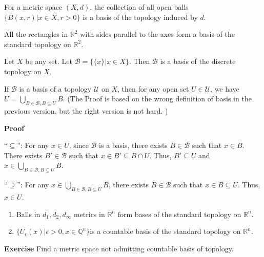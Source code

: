 \documentclass[main.tex]{subfiles}
\begin{document}
\begin{example}\label{basis1}
    For a metric space $(X, d)$, the collection of all open balls $\{B(x, r) | x \in X, r > 0\}$ is a basis of the topology induced by $d$.
\end{example}
\begin{example}\label{basis2}
    All the rectangles in $\mathbb{R}^2$ with sides parallel to the axes form a basis of the standard topology on $\mathbb{R}^2$.
\end{example}

\begin{example}
    Let $X$ be any set. Let $\mathcal{B} = \{\{x\} | x \in X\}$. Then $\mathcal{B}$ is a basis of the discrete topology on $X$.
\end{example}

\begin{theorem}
    If $\mathcal{B}$ is a basis of a topology $\mathcal{U}$ on $X$, then for any open set $U \in \mathcal{U}$, we have $U = \bigcup_{B \in \mathcal{B}, B \subseteq U} B$. (The Proof is based on the wrong definition of basis in the previous version, but the right version is not hard. )
\end{theorem}
\par \noindent \textbf{Proof}
\par ``$\subseteq$'': For any $x \in U$, since $\mathcal{B}$ is a basis, there exists $B \in \mathcal{B}$ such that $x \in B$. There exists $B' \in \mathcal{B}$ such that $x \in B' \subseteq B \cap U$. Thus, $B' \subseteq U$ and $x \in \bigcup_{B \in \mathcal{B}, B \subseteq U} B$.
\par ``$\supseteq$'': For any $x \in \bigcup_{B \in \mathcal{B}, B \subseteq U} B$, there exists $B \in \mathcal{B}$ such that $x \in B \subseteq U$. Thus, $x \in U$.
\begin{example}
    \begin{enumerate}
        \item Balls in $d_1, d_2, d_{\infty}$ metrics in $\mathbb{R}^n$ form bases of the standard topology on $\mathbb{R}^n$. 
        \item $\{U_{\epsilon}(x)| \epsilon > 0, x\in \mathbb{Q}^n\}$is a countable basis of the standard topology on $\mathbb{R}^n$. 
    \end{enumerate}
\end{example}
\par \noindent \textbf{Exercise} Find a metric space not admitting countable basis of topology. 
\end{document}
